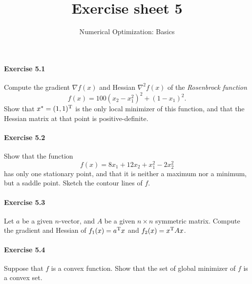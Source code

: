 
\title{Exercise sheet 5}
\subtitle{Numerical Optimization: Basics}
\usepackage{amsmath}
\usepackage{amsfonts}
\newcommand\R{\ensuremath{\mathbb{R}}}
\newcommand\dd{\ensuremath{\text{d}}}
\newcommand\tp{\ensuremath{\text{\upshape T}}}

\maketitle

\paragraph{Exercise 5.1} %
Compute  the gradient $\nabla f(x)$ and Hessian $\nabla^2f(x)$ of the
\emph{Rosenbrock function}
\begin{equation}\label{eq:rosenbrock}
  f(x) = 100(x_2-x_1^2)^2 + (1-x_1)^2.
\end{equation}
Show that $x^*=(1,1)^\tp$ is the only local minimizer of this function, and
that the Hessian matrix at that point is positive-definite.

\paragraph{Exercise 5.2} %
Show that the function
\[
  f(x) = 8x_1 + 12x_2 + x_1^2 - 2x_2^2
\]
has only one stationary point, and that it is neither a maximum nor a minimum,
but a saddle point. Sketch the contour lines of $f$.

\paragraph{Exercise 5.3} %
Let $a$ be a given $n$-vector, and $A$ be a given $n\times n$ symmetric matrix. Compute the
gradient and Hessian of $f_1(x) = a^\tp x$ and $f_2 (x) =x^\tp Ax$.


\paragraph{Exercise 5.4} %
Suppose that $f$ is a convex function. Show that the set of global minimizer
of $f$ is a convex set.

